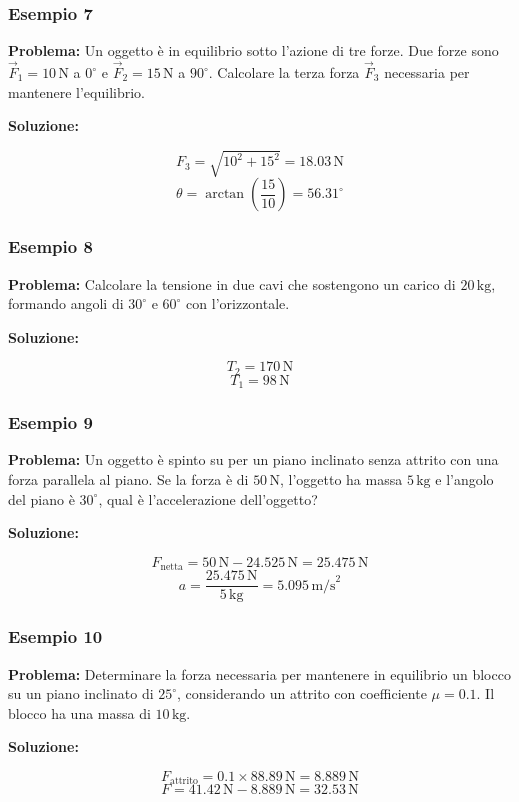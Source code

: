 \documentclass{beamer}
\begin{document}
\begin{frame}
\frametitle{Esempio 7}
\textbf{Problema:} Un oggetto è in equilibrio sotto l'azione di tre forze. Due forze sono $\vec{F}_1 = 10\,\text{N}$ a $0^\circ$ e $\vec{F}_2 = 15\,\text{N}$ a $90^\circ$. Calcolare la terza forza $\vec{F}_3$ necessaria per mantenere l'equilibrio.

\textbf{Soluzione:}

\begin{equation*}
F_3 = \sqrt{10^2 + 15^2} = 18.03\,\text{N}
\end{equation*}
\begin{equation*}
\theta = \arctan{\left(\frac{15}{10}\right)} = 56.31^\circ
\end{equation*}
\end{frame}

\begin{frame}
\frametitle{Esempio 8}
\textbf{Problema:} Calcolare la tensione in due cavi che sostengono un carico di $20\,\text{kg}$, formando angoli di $30^\circ$ e $60^\circ$ con l'orizzontale.

\textbf{Soluzione:}

\begin{equation*}
T_2 = 170\,\text{N}
\end{equation*}
\begin{equation*}
T_1 = 98\,\text{N}
\end{equation*}
\end{frame}

\begin{frame}
\frametitle{Esempio 9}
\textbf{Problema:} Un oggetto è spinto su per un piano inclinato senza attrito con una forza parallela al piano. Se la forza è di $50\,\text{N}$, l'oggetto ha massa $5\,\text{kg}$ e l'angolo del piano è $30^\circ$, qual è l'accelerazione dell'oggetto?

\textbf{Soluzione:}

\begin{equation*}
F_{\text{netta}} = 50\,\text{N} - 24.525\,\text{N} = 25.475\,\text{N}
\end{equation*}
\begin{equation*}
a = \frac{25.475\,\text{N}}{5\,\text{kg}} = 5.095\,\text{m/s}^2
\end{equation*}
\end{frame}

\begin{frame}
\frametitle{Esempio 10}
\textbf{Problema:} Determinare la forza necessaria per mantenere in equilibrio un blocco su un piano inclinato di $25^\circ$, considerando un attrito con coefficiente $\mu = 0.1$. Il blocco ha una massa di $10\,\text{kg}$.

\textbf{Soluzione:}

\begin{equation*}
F_{\text{attrito}} = 0.1 \times 88.89\,\text{N} = 8.889\,\text{N}
\end{equation*}
\begin{equation*}
F = 41.42\,\text{N} - 8.889\,\text{N} = 32.53\,\text{N}
\end{equation*}
\end{frame}
\end{document}
